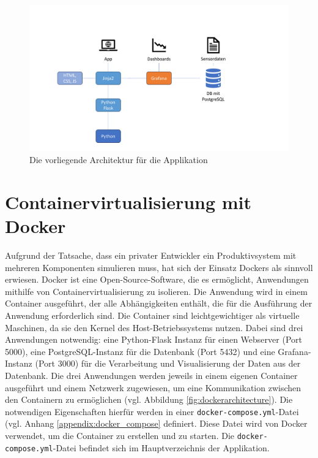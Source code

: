\begin{figure}[t]
    \centering
    \includegraphics[width=\widefigurewidth]{appendices/Architektur.pdf}
    \caption[Architektur]{Die vorliegende Architektur für die Applikation}
    \label{fig:architecture}
\end{figure}

\section{Containervirtualisierung mit Docker}
Aufgrund der Tatsache, dass ein privater Entwickler ein Produktivsystem mit mehreren Komponenten simulieren muss, hat sich der Einsatz Dockers als sinnvoll erwiesen. Docker ist eine Open-Source-Software, die es ermöglicht, Anwendungen mithilfe von Containervirtualisierung zu isolieren. Die Anwendung wird in einem Container ausgeführt, der alle Abhängigkeiten enthält, die für die Ausführung der Anwendung erforderlich sind. Die Container sind leichtgewichtiger als virtuelle Maschinen, da sie den Kernel des Host-Betriebssystems nutzen. Dabei sind drei Anwendungen notwendig: eine Python-Flask Instanz für einen Webserver (Port 5000), eine PostgreSQL-Instanz für die Datenbank (Port 5432) und eine Grafana-Instanz (Port 3000) für die Verarbeitung und Visualisierung der Daten aus der Datenbank. Die drei Anwendungen werden jeweils in einem eigenen Container ausgeführt und einem Netzwerk zugewiesen, um eine Kommunikation zwischen den Containern zu ermöglichen (vgl. Abbildung \ref{fig:dockerarchitecture}). Die notwendigen Eigenschaften hierfür werden in einer \texttt{docker-compose.yml}-Datei (vgl. Anhang \ref{appendix:docker_compose} definiert. Diese Datei wird von Docker verwendet, um die Container zu erstellen und zu starten. Die \texttt{docker-compose.yml}-Datei befindet sich im Hauptverzeichnis der Applikation.

